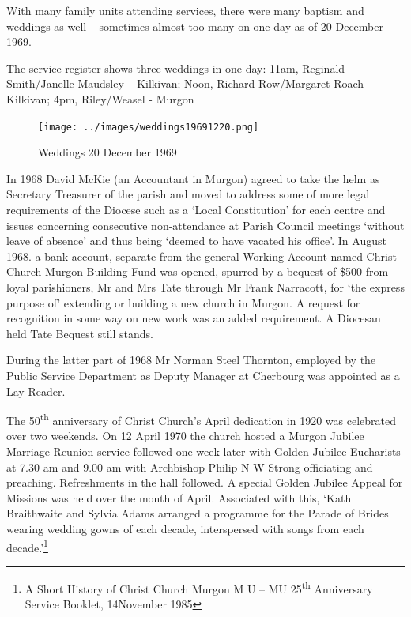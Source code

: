 With many family units attending services, there were many baptism and weddings as well -- sometimes almost too many on one day as of 20 December 1969.



The service register shows three weddings in one day: 11am, Reginald Smith/Janelle Maudsley -- Kilkivan; Noon, Richard Row/Margaret Roach -- Kilkivan; 4pm, Riley/Weasel - Murgon









\begin{figure}
\begin{center}
\texttt{[image: ../images/weddings19691220.png]}
\caption{Weddings 20 December 1969}
\end{center}
\end{figure}




In 1968 David McKie (an Accountant in Murgon) agreed to take the helm as Secretary Treasurer of the parish and moved to address some of more legal requirements of the Diocese such as a `Local Constitution' for each centre and issues concerning consecutive non-attendance at Parish Council meetings `without leave of absence' and thus being `deemed to have vacated his office'. In August 1968. a bank account, separate from the general Working Account named Christ Church Murgon Building Fund was opened, spurred by a bequest of \$500 from loyal parishioners, Mr and Mrs Tate through Mr Frank Narracott, for `the express purpose of' extending or building a new church in Murgon. A request for recognition in some way on new work was an added requirement. A Diocesan held Tate Bequest still stands.



During the latter part of 1968 Mr Norman Steel Thornton, employed by the Public Service Department as Deputy Manager at Cherbourg was appointed as a Lay Reader.



The 50\textsuperscript{th} anniversary of Christ Church's April dedication in 1920 was celebrated over two weekends. On 12 April 1970 the church hosted a Murgon Jubilee Marriage Reunion service followed one week later with Golden Jubilee Eucharists at 7.30 am and 9.00 am with Archbishop Philip N W Strong officiating and preaching. Refreshments in the hall followed. A special Golden Jubilee Appeal for Missions was held over the month of April. Associated with this, `Kath Braithwaite and Sylvia Adams arranged a programme for the Parade of Brides wearing wedding gowns of each decade, interspersed with songs from each decade.'\footnote{A Short History of Christ Church Murgon M U -- MU 25\textsuperscript{th} Anniversary Service Booklet, 14November 1985}



